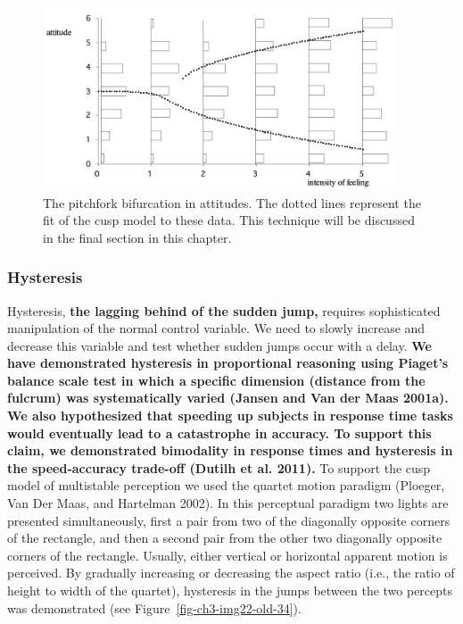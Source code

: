 \documentclass[
  letterpaper,
]{scrbook}
\begin{document}
\begin{figure}

{\centering \includegraphics[width=4.12375in,height=2.13456in]{media/ch3/image21.jpg}

}

\caption{\label{fig-ch3-img21-old-33}The pitchfork bifurcation in
attitudes. The dotted lines represent the fit of the cusp model to these
data. This technique will be discussed in the final section in this
chapter.}

\end{figure}

\hypertarget{hysteresis}{%
\subsubsection{Hysteresis}\label{hysteresis}}

Hysteresis, \textbf{the lagging behind of the sudden jump,} requires
sophisticated manipulation of the normal control variable. We need to
slowly increase and decrease this variable and test whether sudden jumps
occur with a delay. \textbf{We have demonstrated hysteresis in
proportional reasoning using Piaget's balance scale test in which a
specific dimension (distance from the fulcrum) was systematically varied
(Jansen and Van der Maas 2001a). We also hypothesized that speeding up
subjects in response time tasks would eventually lead to a catastrophe
in accuracy. To support this claim, we demonstrated bimodality in
response times and hysteresis in the speed-accuracy trade-off (Dutilh et
al. 2011).} To support the cusp model of multistable perception we used
the quartet motion paradigm (Ploeger, Van Der Maas, and Hartelman 2002).
In this perceptual paradigm two lights are presented simultaneously,
first a pair from two of the diagonally opposite corners of the
rectangle, and then a second pair from the other two diagonally opposite
corners of the rectangle. Usually, either vertical or horizontal
apparent motion is perceived. By gradually increasing or decreasing the
aspect ratio (i.e., the ratio of height to width of the quartet),
hysteresis in the jumps between the two percepts was demonstrated (see
Figure~\ref{fig-ch3-img22-old-34}).
\end{document}
